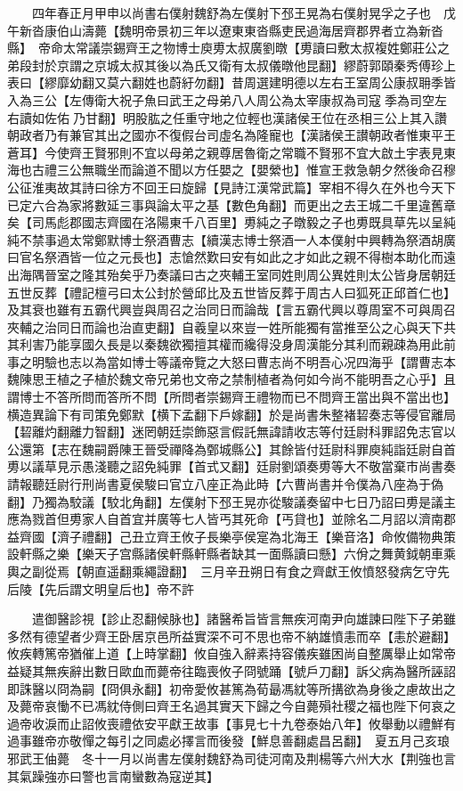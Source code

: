 　　四年春正月甲申以尚書右僕射魏舒為左僕射下邳王晃為右僕射晃孚之子也　戊午新沓康伯山濤薨【魏明帝景初三年以遼東東沓縣吏民過海居齊郡界者立為新沓縣】　帝命太常議崇錫齊王之物博士庾旉太叔廣劉暾【旉讀曰敷太叔複姓鄭莊公之弟段封於京謂之京城太叔其後以為氏又衛有太叔儀暾他昆翻】繆蔚郭頤秦秀傅珍上表曰【繆靡幼翻又莫六翻姓也蔚紆勿翻】昔周選建明德以左右王室周公康叔耼季皆入為三公【左傳衛大祝子魚曰武王之母弟八人周公為太宰康叔為司寇季為司空左右讀如佐佑乃甘翻】明股肱之任重守地之位輕也漢諸侯王位在丞相三公上其入讚朝政者乃有兼官其出之國亦不復假台司虛名為隆寵也【漢諸侯王讃朝政者惟東平王蒼耳】今使齊王賢邪則不宜以母弟之親尊居魯衛之常職不賢邪不宜大啟土宇表見東海也古禮三公無職坐而論道不聞以方任嬰之【嬰縈也】惟宣王救急朝夕然後命召穆公征淮夷故其詩曰徐方不回王曰旋歸【見詩江漢常武篇】宰相不得久在外也今天下已定六合為家將數延三事與論太平之基【數色角翻】而更出之去王城二千里違舊章矣【司馬彪郡國志齊國在洛陽東千八百里】旉純之子暾毅之子也旉既具草先以呈純純不禁事過太常鄭默博士祭酒曹志【續漢志博士祭酒一人本僕射中興轉為祭酒胡廣曰官名祭酒皆一位之元長也】志愴然歎曰安有如此之才如此之親不得樹本助化而遠出海隅晉室之隆其殆矣乎乃奏議曰古之夾輔王室同姓則周公異姓則太公皆身居朝廷五世反葬【禮記檀弓曰太公封於營邱比及五世皆反葬于周古人曰狐死正邱首仁也】及其衰也雖有五霸代興豈與周召之治同日而論哉【言五霸代興以尊周室不可與周召夾輔之治同日而論也治直吏翻】自羲皇以來豈一姓所能獨有當推至公之心與天下共其利害乃能享國久長是以秦魏欲獨擅其權而纔得没身周漢能分其利而親疎為用此前事之明驗也志以為當如博士等議帝覽之大怒曰曹志尚不明吾心况四海乎【謂曹志本魏陳思王植之子植於魏文帝兄弟也文帝之禁制植者為何如今尚不能明吾之心乎】且謂博士不答所問而答所不問【所問者崇錫齊王禮物而已不問齊王當出與不當出也】横造異論下有司策免鄭默【横下孟翻下戶嫁翻】於是尚書朱整褚䂮奏志等侵官離局【䂮離灼翻離力智翻】迷罔朝廷崇飾惡言假託無諱請收志等付廷尉科罪詔免志官以公還第【志在魏嗣爵陳王晉受禪降為鄄城縣公】其餘皆付廷尉科罪庾純詣廷尉自首旉以議草見示愚淺聽之詔免純罪【首式又翻】廷尉劉頌奏旉等大不敬當棄市尚書奏請報聽廷尉行刑尚書夏侯駿曰官立八座正為此時【六曹尚書并令僕為八座為于偽翻】乃獨為駮議【駮北角翻】左僕射下邳王晃亦從駿議奏留中七日乃詔曰旉是議主應為戮首但旉家人自首宜并廣等七人皆丐其死命【丐貸也】並除名二月詔以濟南郡益齊國【濟子禮翻】己丑立齊王攸子長樂亭侯寔為北海王【樂音洛】命攸備物典策設軒縣之樂【樂天子宫縣諸侯軒縣軒縣者缺其一面縣讀曰懸】六佾之舞黄鉞朝車乘輿之副從焉【朝直遥翻乘繩證翻】　三月辛丑朔日有食之齊獻王攸憤怒發病乞守先后陵【先后謂文明皇后也】帝不許

　　遣御醫診視【診止忍翻候脉也】諸醫希旨皆言無疾河南尹向雄諫曰陛下子弟雖多然有德望者少齊王卧居京邑所益實深不可不思也帝不納雄憤恚而卒【恚於避翻】攸疾轉篤帝猶催上道【上時掌翻】攸自強入辭素持容儀疾雖困尚自整厲舉止如常帝益疑其無疾辭出數日歐血而薨帝往臨喪攸子冏號踊【號戶刀翻】訴父病為醫所誣詔即誅醫以冏為嗣【冏俱永翻】初帝愛攸甚篤為荀朂馮紞等所搆欲為身後之慮故出之及薨帝哀慟不已馮紞侍側曰齊王名過其實天下歸之今自薨殞社稷之福也陛下何哀之過帝收淚而止詔攸喪禮依安平獻王故事【事見七十九卷泰始八年】攸舉動以禮鮮有過事雖帝亦敬憚之每引之同處必擇言而後發【鮮息善翻處昌呂翻】　夏五月己亥琅邪武王伷薨　冬十一月以尚書左僕射魏舒為司徒河南及荆楊等六州大水【荆強也言其氣躁強亦曰警也言南蠻數為寇逆其】

